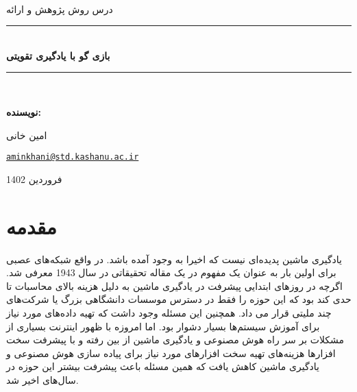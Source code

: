 \documentclass[12pt]{report}
\newcommand{\HRule}{\rule{\linewidth}{0.5mm}} %
\newlength{\saveparindent}
\newcommand{\indentpar}{\par\hspace*{\saveparindent}\ignorespaces}
\begin{document}
\begin{center}
    \mbox{}\\[2.0cm]
    \textsc{\Huge درس روش پژوهش و ارائه}\\[2.5cm]
    \HRule\\[0.4cm]
    {\large \bf {\selectfont بازی گو با یادگیری تقویتی}}\\[0.2cm]
    \HRule\\[1.5cm]
\end{center}

\begin{flushright}
    \textbf{\selectfont نویسنده:}
\end{flushright}

\begin{center}
    \begin{minipage}{0.5\textwidth}
        \begin{flushright}
            \indentpar امین خانی
        \end{flushright}
    \end{minipage}%
    \begin{minipage}{0.5\textwidth}
        \begin{flushleft}
            \indentpar \href{mailto:aminkhani@std.kashanu.ac.ir}{\texttt{aminkhani@std.kashanu.ac.ir}}
        \end{flushleft}
    \end{minipage}
\end{center}


\vspace{\fill}
\begin{minipage}[b]{\textwidth}
    \centering
    \large
    فروردین 1402
    \vspace{30mm}
\end{minipage}%

\thispagestyle{empty}

\setcounter{page}{0}

\newpage
\tableofcontents
\newpage


\section{مقدمه}

یادگیری ماشین  پدیده‌ای نیست که اخیرا به وجود آمده باشد. در واقع شبکه‌های عصبی برای اولین بار به عنوان یک مفهوم در یک مقاله تحقیقاتی در سال 1943 معرفی شد. اگرچه در روزهای ابتدایی پیشرفت در یادگیری ماشین به دلیل هزینه بالای محاسبات تا حدی کند بود که این حوزه را فقط در دسترس موسسات دانشگاهی بزرگ یا شرکت‌های چند ملیتی قرار می داد. همچنین این مسئله وجود داشت که تهیه داده‌های مورد نیاز برای آموزش سیستم‌ها بسیار دشوار بود. اما امروزه با ظهور اینترنت بسیاری از مشکلات بر سر راه هوش مصنوعی و یادگیری ماشین از بین رفته و با پیشرفت سخت افزارها هزینه‌های تهیه سخت افزارهای مورد نیاز برای پیاده سازی هوش مصنوعی و یادگیری ماشین کاهش یافت که همین مسئله باعث پیشرفت بیشتر این حوزه در سال‌های اخیر شد.
\end{document}

